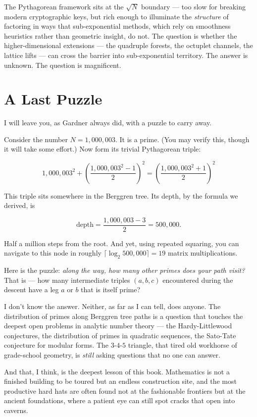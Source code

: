 The Pythagorean framework sits at the $\sqrt{N}$ boundary --- too slow for breaking modern cryptographic keys, but rich enough to illuminate the \textit{structure} of factoring in ways that sub-exponential methods, which rely on smoothness heuristics rather than geometric insight, do not. The question is whether the higher-dimensional extensions --- the quadruple forests, the octuplet channels, the lattice lifts --- can cross the barrier into sub-exponential territory. The answer is unknown. The question is magnificent.


\ornbreak



\section{A Last Puzzle}


I will leave you, as Gardner always did, with a puzzle to carry away.

Consider the number $N = 1{,}000{,}003$. It is a prime. (You may verify this, though it will take some effort.) Now form its trivial Pythagorean triple:

\[
1{,}000{,}003^2 + \left(\frac{1{,}000{,}003^2 - 1}{2}\right)^{\!2} = \left(\frac{1{,}000{,}003^2 + 1}{2}\right)^{\!2}
\]

This triple sits somewhere in the Berggren tree. Its depth, by the formula we derived, is

\[
\text{depth} = \frac{1{,}000{,}003 - 3}{2} = 500{,}000.
\]

Half a million steps from the root. And yet, using repeated squaring, you can navigate to this node in roughly $\lceil \log_2 500{,}000 \rceil = 19$ matrix multiplications.

Here is the puzzle: \textit{along the way, how many other primes does your path visit?} That is --- how many intermediate triples $(a, b, c)$ encountered during the descent have a leg $a$ or $b$ that is itself prime?

I don't know the answer. Neither, as far as I can tell, does anyone. The distribution of primes along Berggren tree paths is a question that touches the deepest open problems in analytic number theory --- the Hardy-Littlewood conjectures, the distribution of primes in quadratic sequences, the Sato-Tate conjecture for modular forms. The $3$-$4$-$5$ triangle, that tired old workhorse of grade-school geometry, is \textit{still} asking questions that no one can answer.

And that, I think, is the deepest lesson of this book. Mathematics is not a finished building to be toured but an endless construction site, and the most productive hard hats are often found not at the fashionable frontiers but at the ancient foundations, where a patient eye can still spot cracks that open into caverns.

